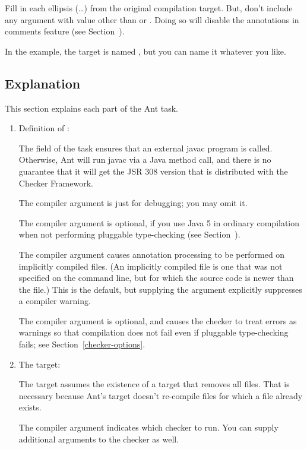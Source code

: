 \begin{enumerate}
Fill in each ellipsis (\ldots) from the original compilation target.  But,
don't include any  argument with value other than 
or .  Doing so will disable the annotations in
comments feature (see Section~).

In the example, the target is named , but you can
name it whatever you like.
\end{enumerate}

\subsection{Explanation\label{ant-task-explanation}}

This section explains each part of the Ant task.

\begin{enumerate}
\item Definition of :

The  field of the  task
ensures that an external javac program is called.  Otherwise, Ant will run
javac via a Java method call, and there is no guarantee that it will get
the JSR 308 version that is distributed with the Checker Framework.

The  compiler argument is just for debugging; you may omit
it.

The  compiler argument is optional, if you use Java 5 in
ordinary compilation when not performing pluggable type-checking (see
Section~).

The  compiler argument causes annotation processing
to be performed on implicitly compiled files.  (An implicitly compiled file
is one that was not specified on the command line, but for which the source
code is newer than the  file.)  This is the default, but
supplying the argument explicitly suppresses a compiler warning.

The  compiler argument is optional, and causes the checker to
treat errors as warnings so that compilation does not fail even if
pluggable type-checking fails; see Section~\ref{checker-options}.

\item The  target:

The target assumes the existence of a  target that removes all
 files.  That is necessary because Ant's  target
doesn't re-compile  files for which a  file
already exists.

The  compiler argument indicates which checker to
run.  You can supply additional arguments to the checker as well.

\end{enumerate}


